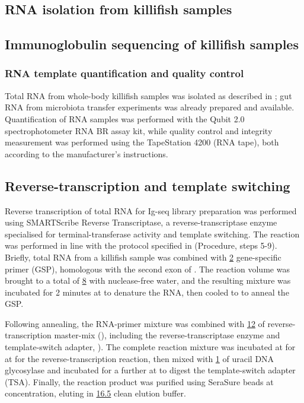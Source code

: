 \subsection{RNA isolation from killifish samples}


\subsection{Immunoglobulin sequencing of killifish samples}
\label{sec:methods_molec_igseq}

\subsubsection{RNA template quantification and quality control}
\label{sec:methods_molec_igseq_template}

Total RNA from whole-body killifish samples was isolated as described in ; gut RNA from microbiota transfer experiments \parencite{smith2017microbiota} was already prepared and available. Quantification of RNA samples was performed with the Qubit 2.0 spectrophotometer RNA BR assay kit, while quality control and integrity measurement was performed using the TapeStation 4200 (RNA tape), both according to the manufacturer's instructions.

\subsection{Reverse-transcription and template switching}
\label{sec:methods_molec_igseq_rt}

Reverse transcription of total RNA for Ig-seq library preparation was performed using SMARTScribe Reverse Transcriptase, a reverse-transcriptase enzyme specialised for terminal-transferase activity and template switching. %
The reaction was performed in line with the protocol specified in \parencite{turchaninova2016igprep} (Procedure, steps 5-9). Briefly,  total RNA from a killifish sample was combined with \ul{2}  gene-specific primer (GSP), homologous with the second \ch exon of \Nfu {}. %
The reaction volume was brought to a total of \ul{8} with nuclease-free water, and the resulting mixture was incubated for 2 minutes at  to denature the RNA, then cooled to  to anneal the GSP. 

Following annealing, the RNA-primer mixture was combined with \ul{12} of reverse-transcription master-mix (), including the reverse-transcriptase enzyme and template-switch adapter, ). %
The complete reaction mixture was incubated at for  at  for the reverse-transcription reaction, then mixed with \ul{1} of uracil DNA glycosylase and incubated for a further  at  to digest the template-switch adapter (TSA). Finally, the reaction product was purified using SeraSure beads at  concentration, eluting in \ul{16.5} clean elution buffer. %

